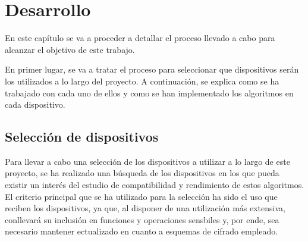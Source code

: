 %
%
%
% 
%
%
%
%

\chapter{Desarrollo}\label{cha:desarrollo}


En este capítulo se va a proceder a detallar el proceso llevado a cabo para alcanzar el objetivo de este trabajo.

En primer lugar, se va a tratar el proceso para seleccionar que dispositivos serán los utilizados a lo largo del proyecto.
A continuación, se explica como se ha trabajado con cada uno de ellos y como se han implementado los algoritmos en cada dispositivo.


\section{Selección de dispositivos}\label{sec:sel-disp}

Para llevar a cabo una selección de los dispositivos a utilizar a lo largo de este proyecto, se ha realizado una búsqueda de los dispositivos en los que pueda existir un interés del estudio de compatibilidad y rendimiento de estos algoritmos.
El criterio principal que se ha utilizado para la selección ha sido el uso que reciben los dispositivos, ya que, al disponer de una utilización más extensiva, conllevará su inclusión en funciones y operaciones sensbiles y, por ende, sea necesario mantener ectualizado en cuanto a esquemas de cifrado empleado.

